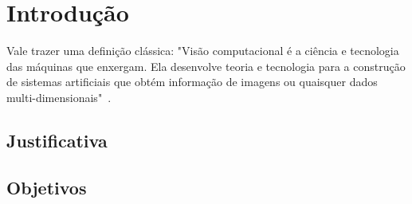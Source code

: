 \chapter{Introdução}
\label{chap:intro}

Vale trazer uma definição clássica: "Visão computacional é a ciência e tecnologia das máquinas que enxergam. Ela desenvolve teoria e tecnologia para a construção de sistemas artificiais que obtém informação de imagens ou quaisquer dados multi-dimensionais"~\cite{antonello2014introduccao}.

\section{Justificativa}
\label{sec:justi}

\section{Objetivos}
\label{sec:objt}







